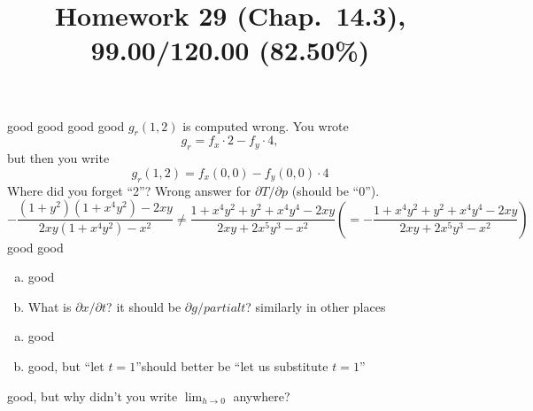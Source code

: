 \documentclass[pstricks,10pt,dvipsnames]{article} %
\title{Homework 29 (Chap.~14.3),
99.00/120.00 (82.50\%)
}
\begin{document}
\maketitle
{}
good
good
good
good
$g_r(1,2)$ is computed wrong. You wrote
\begin{equation*}
	g_r=f_x\cdot2-f_y\cdot4,
\end{equation*}
but then you write
\begin{equation*}
	g_r(1,2)=f_x(0,0)-f_y(0,0)\cdot4
\end{equation*}
Where did you forget ``2''?
Wrong answer for $\partial T/\partial p$ (should be ``0'').
\begin{equation*}
	-\frac{(1+y^2)(1+x^4y^2)-2xy}{2xy(1+x^4y^2)-x^2}\neq\frac{1+x^4y^2+y^2+x^4y^4-2xy}{2xy+2x^5y^3-x^2}
	\left( =-\frac{1+x^4y^2+y^2+x^4y^4-2xy}{2xy+2x^5y^3-x^2} \right)
\end{equation*}
good
good
\begin{enumerate}[(a)]
	\item good
	\item What is $\partial x/\partial t$? it should be $\partial g/partial t$? similarly in other places
\end{enumerate}
\begin{enumerate}[(a)]
	\item good
	\item good, but ``let $t=1$''should better be ``let us substitute $t=1$''
\end{enumerate}
good, but why didn't you write $\lim_{h\to0}$ anywhere?
\end{document}
